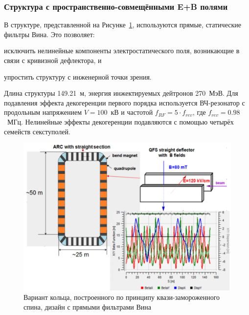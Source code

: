 \subsubsection{Структура с пространственно-совмещёнными E+B полями}\label{chpt2:lattice:QFS:EB}

В структуре, представленной на Рисунке~\ref{fig:QFS_E+B_lattice}, используются прямые, 
статические фильтры Вина. Это позволяет:
\begin{enumerate*}
	\item исключить нелинейные компоненты электростатического поля, 
	возникающие в связи с кривизной дефлектора, и 
	\item упростить структуру с инженерной точки зрения.
\end{enumerate*}

Длина структуры 149.21~м, энергия инжектируемых дейтронов 270~МэВ. 
Для подавления эффекта декогеренции первого порядка используется ВЧ-резонатор 
с продольным напряжением ${V = 100}$~кВ и частотой ${f_{RF} = 5\cdot f_{rev}}$, 
где ${f_{rev} = 0.98}$~МГц. Нелинейные эффекты декогеренции подавляются с помощью 
четырёх семейств секступолей.
\begin{figure}[H]
	\centering
	\includegraphics[width=\linewidth]{images/chapter2/E+B_lattice}
	\caption{Вариант кольца, построенного по принципу квази-замороженного спина, 
		дизайн с прямыми фильтрами Вина
	\label{fig:QFS_E+B_lattice}}
\end{figure}

